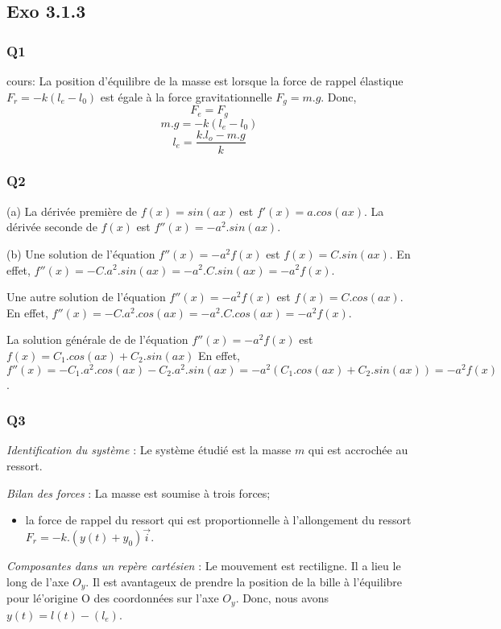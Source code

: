 \documentclass[]{book}
\theoremstyle{definition}
\begin{document}
\subsection*{Exo 3.1.3}
\subsubsection*{Q1}
cours: La position d'\'equilibre de la masse est lorsque la force de rappel \'elastique $F_r=-k(l_e-l_0)$
est \'egale \`a la force gravitationnelle $F_g = m.g$. Donc,
$$F_e = F_g$$
$$m.g = -k(l_e-l_0)$$
$$l_e = \frac{k.l_o - m.g}{k}$$


\subsubsection*{Q2}
(a) La d\'eriv\'ee premi\`ere de $f(x) = sin(ax)$ est $f'(x) = a.cos(ax)$. 
La d\'eriv\'ee seconde de $f(x)$ est $f''(x) = -a^2.sin(ax)$. 

(b) Une solution de l'\'equation $f''(x) = -a^2f(x)$ est $f(x) = C.sin(ax)$. 
En effet, $f''(x) = -C.a^2.sin(ax) = -a^2.C.sin(ax) = -a^2 f(x)$.

Une autre solution de l'\'equation $f''(x) = -a^2f(x)$ est $f(x) = C.cos(ax)$. 
En effet, $f''(x) = -C.a^2.cos(ax) = -a^2.C.cos(ax) = -a^2 f(x)$.

La solution g\'en\'erale de de l'\'equation $f''(x) = -a^2f(x)$ est $f(x) = C_1.cos(ax) + C_2.sin(ax)$
En effet, $f''(x) = -C_1.a^2.cos(ax) - C_2.a^2.sin(ax) = -a^2 (C_1.cos(ax) + C_2.sin(ax)) = -a^2 f(x)$.


\subsubsection*{Q3}
\emph{Identification du syst\`eme} : Le syst\`eme \'etudi\'e est la masse
$m$ qui est accroch\'ee au ressort.


\emph{Bilan des forces} : La masse est soumise \`a trois forces; 
\begin{itemize}
\item la force de rappel du ressort qui est proportionnelle \`a l'allongement
du ressort $F_r = -k.(y(t) + y_0)\overrightarrow{i}$.
\end{itemize}


\emph{Composantes dans un rep\`ere cart\'esien} : Le mouvement est rectiligne.
Il a lieu le long de l'axe $O_y$. Il est avantageux de prendre la
position de la bille \`a l'\'equilibre pour l\'e'origine O des coordonn\'ees sur
l'axe $O_y$. Donc, nous avons $y(t) = l(t) - (l_e)$.
\end{document}
